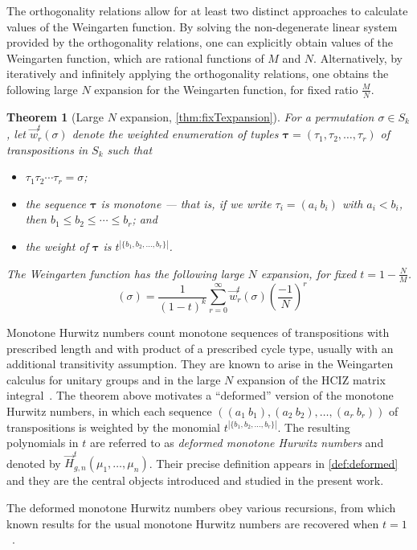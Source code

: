 \documentclass[a4paper]{article}
\theoremstyle{plain}
\newtheorem{theoremx}{Theorem}
\numberwithin{theorem}{section}
\theoremstyle{definition}
\theoremstyle{remark}
\renewcommand{\leq}{\leqslant}
\newcommand{\SM}{\mathbf{S}}			%
\DeclareMathOperator{\SW}{Wg^{\SM}}		%
\newcommand{\dhn}[2]{\vec{w}^{t}_{#1}(#2)}
\newcommand{\HN}[3]{\vec{H}^t_{#1,#2}(#3)}
\begin{document}
The orthogonality relations allow for at least two distinct approaches to calculate values of the Weingarten function. By solving the non-degenerate linear system provided by the orthogonality relations, one can explicitly obtain values of the Weingarten function, which are rational functions of $M$ and $N$. Alternatively, by iteratively and infinitely applying the orthogonality relations, one obtains the following large $N$ expansion for the Weingarten function, for fixed ratio $\frac{M}{N}$.


\begin{theoremx} [Large $N$ expansion, \cref{thm:fixTexpansion}] \label{thm:theoremb}
For a permutation $\sigma \in S_k$, let $\dhn{r}{\sigma}$ denote the weighted enumeration of tuples $\bm{\tau} = (\tau_1, \tau_2, \ldots, \tau_r)$ of transpositions in $S_k$ such that
\begin{itemize}
\item $\tau_1 \tau_2 \cdots \tau_r = \sigma$;
\item the sequence $\bm{\tau}$ is monotone --- that is, if we write $\tau_i = (a_i ~ b_i)$ with $a_i < b_i$, then $b_1 \leq b_2 \leq \cdots \leq b_r$; and
\item the weight of $\bm{\tau}$ is $t^{|\{b_1, b_2, \ldots, b_r\}|}$.
\end{itemize}
The Weingarten function has the following large $N$ expansion, for fixed $t= 1 - \frac{N}{M}$.
\[
\SW(\sigma) = \frac{1}{(1-t)^k} \sum_{r=0}^\infty \dhn{r}{\sigma} \left( \frac{-1}{N} \right)^r
\]
\end{theoremx}


Monotone Hurwitz numbers count monotone sequences of transpositions with prescribed length and with product of a prescribed cycle type, usually with an additional transitivity assumption. They are known to arise in the Weingarten calculus for unitary groups and in the large $N$ expansion of the HCIZ matrix integral~\cite{gou-gua-nov14}. The theorem above motivates a ``deformed'' version of the monotone Hurwitz numbers, in which each sequence $((a_1~b_1), (a_2~b_2), \ldots, (a_r~b_r))$ of transpositions is weighted by the monomial $t^{|\{b_1, b_2, \ldots, b_r\}|}$. The resulting polynomials in $t$ are referred to as {\em deformed monotone Hurwitz numbers} and denoted by $\HN{g}{n}{\mu_1, \ldots, \mu_n}$. Their precise definition appears in \cref{def:deformed} and they are the central objects introduced and studied in the present work. 


The deformed monotone Hurwitz numbers obey various recursions, from which known results for the usual monotone Hurwitz numbers are recovered when $t = 1$~\cite{gou-gua-nov13a, do-dye-mat17, cha-do21}.
\end{document}
